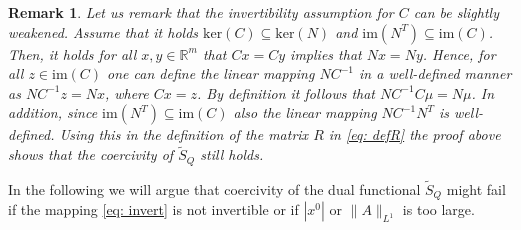 \documentclass[11pt]{article}
\newcommand{\R}{\mathbb R}
\newtheorem{remark}{Remark}[section]
\begin{document}
\begin{remark}
Let us remark that the invertibility assumption for $C$ can be slightly weakened.
Assume that it holds $\text{ker}(C) \subseteq \text{ker}(N)$ and $\text{im}(N^T) \subseteq \text{im}(C)$. Then, it holds for all $x,y \in \R^m$ that $Cx = Cy$ implies that $Nx = Ny$. Hence, for all $z \in \text{im}(C)$ one can define the linear mapping $NC^{-1}$ in a well-defined manner  as $NC^{-1}z = Nx$, where $Cx = z$. By definition it follows that $N C^{-1} C\mu = N\mu$. In addition, since $\text{im}(N^T) \subseteq \text{im}(C)$ also the linear mapping $NC^{-1} N^T$ is well-defined. Using this in the definition of the matrix $R$ in \eqref{eq: defR} the proof above shows that the coercivity of $\tilde{S}_Q$ still holds. 

\end{remark}

In the following we will argue that coercivity of the dual functional $\tilde{S}_Q$ might fail if the mapping \eqref{eq: invert} is not invertible or if $|x^0|$ or $\|A \|_{L^1}$ is too large.
\end{document}
